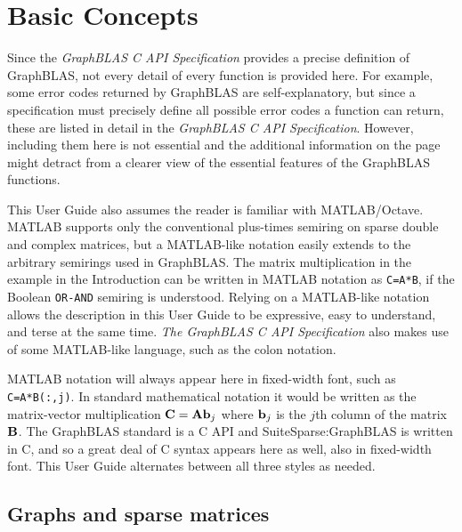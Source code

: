 \documentclass[12pt]{article}
\begin{document}
\section{Basic Concepts} %
\label{basic}

Since the {\em GraphBLAS C API Specification} provides a precise definition of
GraphBLAS, not every detail of every function is provided here.  For example,
some error codes returned by GraphBLAS are self-explanatory, but since a
specification must precisely define all possible error codes a function can
return, these are listed in detail in the {\em GraphBLAS C API Specification}.
However, including them here is not essential and the additional information on
the page might detract from a clearer view of the essential features of the
GraphBLAS functions.

This User Guide also assumes the reader is familiar with MATLAB/Octave.
MATLAB supports only the conventional plus-times semiring on sparse
double and complex matrices, but a MATLAB-like notation easily extends to the
arbitrary semirings used in GraphBLAS.  The matrix multiplication in the
example in the Introduction can be written in MATLAB notation as
\verb'C=A*B', if the Boolean \verb'OR-AND' semiring is understood.  Relying on
a MATLAB-like notation allows the description in this User Guide to be
expressive, easy to understand, and terse at the same time.  {\em The GraphBLAS
C API Specification} also makes use of some MATLAB-like language, such
as the colon notation.

MATLAB notation will always appear here in fixed-width font, such as
\verb'C=A*B(:,j)'.  In standard mathematical notation it would be written as
the matrix-vector multiplication ${\bf C = A b}_j$ where ${\bf b}_j$ is the
$j$th column of the matrix ${\bf B}$.  The GraphBLAS standard is a C API and
SuiteSparse:GraphBLAS is written in C, and so a great deal of C syntax appears
here as well, also in fixed-width font.  This User Guide alternates between all
three styles as needed.

\subsection{Graphs and sparse matrices} %
\label{sparse}
\end{document}
